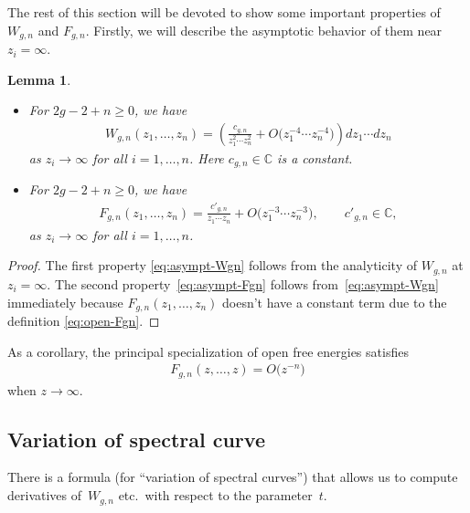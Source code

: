 \documentclass[pdftex]{sigma}
\newtheorem{lem}[thm]{Lemma}
\theoremstyle{definition}
\numberwithin{equation}{section}
\def\bbC{{\mathbb C}}
\begin{document}
The rest of this section will be devoted to
show some important properties of $W_{g,n}$ and $F_{g,n}$.
Firstly, we will describe the asymptotic behavior
of them near $z_{i} = \infty$.

\begin{lem} \label{lem:decay-Wgn-Fgn}\quad
\begin{itemize}\itemsep=0pt
\item[$(i)$]
For $2g-2+n \ge 0$, we have
\begin{gather} \label{eq:asympt-Wgn}
W_{g,n}(z_{1},\dots,z_{n}) =
\left(\frac{c_{g,n}}{z_{1}^{2}\cdots z_{n}^{2}}
+ O\big(z_{1}^{-4}\cdots z_{n}^{-4}\big) \right)dz_{1}\cdots dz_{n}
\end{gather}
as $z_{i} \rightarrow \infty$ for all $i=1,\dots,n$.
Here $c_{g,n} \in \bbC$ is a constant.
\item[$(ii)$] %
For $2g-2+n \ge 0$, we have
\begin{gather} \label{eq:asympt-Fgn}
F_{g,n}(z_{1},\dots,z_{n}) =
\frac{c'_{g,n}}{z_{1}\cdots z_{n}} +
O\big(z_{1}^{-3}\cdots z_{n}^{-3}\big), \qquad
c'_{g,n} \in \bbC,
\end{gather}
as $z_{i} \rightarrow \infty$ for all $i=1,\dots,n$.
\end{itemize}
\end{lem}

\begin{proof}
The f\/irst property \eqref{eq:asympt-Wgn} follows from the
analyticity of $W_{g,n}$ at $z_i = \infty$.
The second property~\eqref{eq:asympt-Fgn} follows
from~\eqref{eq:asympt-Wgn} immediately
because $F_{g,n}(z_{1},\dots,z_{n})$ doesn't have
a constant term due to the def\/inition \eqref{eq:open-Fgn}.
\end{proof}

As a corollary, the principal specialization
of open free energies satisf\/ies
\begin{gather} \label{eq:decay-of-Fgn-prin}
F_{g,n}(z,\dots,z) = O\big(z^{-n}\big)
\end{gather}
when $z \rightarrow \infty$.

\subsection{Variation of spectral curve}
\label{section:variation-formula}

There is a formula (for ``variation of spectral curves'')
that allows us to compute derivatives of~$W_{g,n}$ etc.\
with respect to the parameter~$t$.
\end{document}
